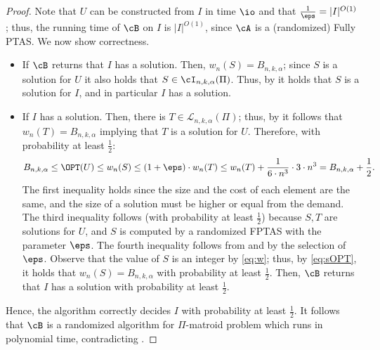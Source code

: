 \begin{proof}
		Note that $U$ can be constructed from $I$ in time $\io$ and that $\frac{1}{\eps} = |I|^{O(1)}$; thus, the running time of $\cB$ on $I$ is $|I|^{O(1)}$, since $\cA$ is a (randomized) Fully PTAS. We now show correctness. %
		\begin{itemize}
			\item If $\cB$ returns that $I$ has a solution. Then, $w_n(S) = B_{n,k,\alpha}$; since $S$ is a solution for $U$ it also holds that $S \in \cI_{n,k,\alpha}(\Pi)$. Thus, by  it holds that $S$ is a solution for  $I$, and in particular $I$ has a solution.
			\item If $I$ has a solution. Then, there is $T \in \mathcal{L}_{n,k,\alpha}(\Pi)$; thus, by   it follows that $w_n(T) = B_{n,k,\alpha}$ implying that $T$ is a solution for $U$.  Therefore, with probability at least $\frac{1}{2}$: 
			\begin{equation}
				\label{eq:sOPT}
				B_{n,k,\alpha} \leq \OPT(U) \leq w_n(S) \leq (1+\eps) \cdot w_n(T) \leq  w_n(T)+\frac{1}{6 \cdot n^3} \cdot 3 \cdot n^3 = B_{n,k,\alpha}+\frac{1}{2}.
			\end{equation} 	The first inequality holds since %
			the size and the cost of each element are the same, and the size of a solution must be higher or equal from the demand. The third inequality follows (with probability at least $\frac{1}{2}$) because $S,T$ are solutions for $U$, and $S$ is computed by a randomized FPTAS with the parameter $\eps$. The fourth inequality follows from  and by the selection of $\eps$. Observe that the value of $S$ is an integer by \eqref{eq:w}; thus, by \eqref{eq:sOPT}, %
			it holds that $w_n(S) = B_{n,k,\alpha}$ with probability at least $\frac{1}{2}$. Then, $\cB$ returns that $I$ has a solution with probability at least $\frac{1}{2}$.  
		\end{itemize}
		Hence, %
		the algorithm correctly decides $I$ with probability at least $\frac{1}{2}$. %
		It follows that $\cB$ is %
		a randomized algorithm for $\Pi$-matroid problem which runs in polynomial time, contradicting  .

	\end{proof}
	
	
	
	
	
	
	